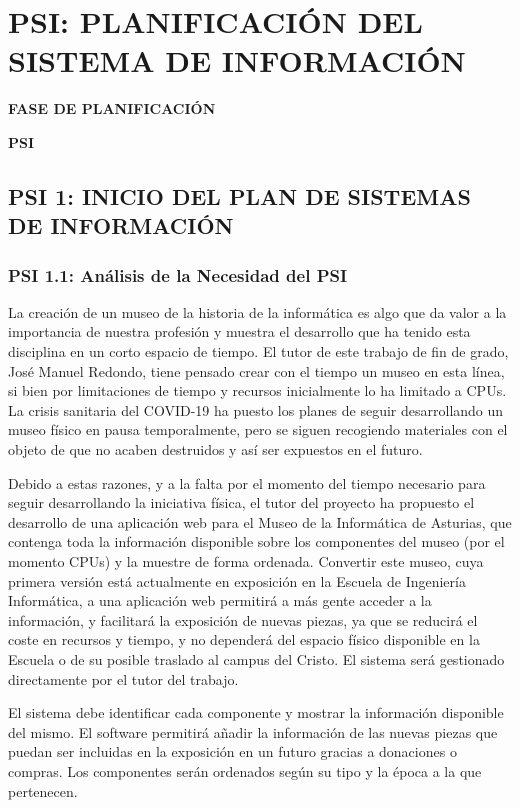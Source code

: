 \pagestyle{fancy}
\chapter{PSI: PLANIFICACIÓN DEL SISTEMA DE INFORMACIÓN}

	\vspace{2cm}	
	\begin{center}
	{\Large \textbf{FASE DE PLANIFICACIÓN} \par}
	\end{center}
	\vspace{5cm}
	
	\begin{center}
	\Huge \textbf{PSI}\par
	\end{center}

\newpage

\section{PSI 1: INICIO DEL PLAN DE SISTEMAS DE INFORMACIÓN}

\subsection{PSI 1.1: Análisis de la Necesidad del PSI} 
La creación de un museo de la historia de la informática es algo que da valor a la importancia de nuestra profesión y muestra el desarrollo que ha tenido esta disciplina en un corto espacio de tiempo. El tutor de este trabajo de fin de grado, José Manuel Redondo, tiene pensado crear con el tiempo un museo en esta línea, si bien por limitaciones de tiempo y recursos inicialmente lo ha limitado a CPUs. La crisis sanitaria del COVID-19 ha puesto los planes de seguir desarrollando un museo físico en pausa temporalmente, pero se siguen recogiendo materiales con el objeto de que no acaben destruidos y así ser expuestos en el futuro.\par
Debido a estas razones, y a la falta por el momento del tiempo necesario para seguir desarrollando la iniciativa física, el tutor del proyecto ha propuesto el desarrollo de una aplicación web para el Museo de la Informática de Asturias, que contenga toda la información disponible sobre los componentes del museo (por el momento CPUs) y la muestre de forma ordenada. Convertir este museo, cuya primera versión está actualmente en exposición en la Escuela de Ingeniería Informática, a una aplicación web permitirá a más gente acceder a la información, y facilitará la exposición de nuevas piezas, ya que se reducirá el coste en recursos y tiempo, y no dependerá del espacio físico disponible en la Escuela o de su posible traslado al campus del Cristo. El sistema será gestionado directamente por el tutor del trabajo.
\par El sistema debe identificar cada componente y mostrar la información disponible del mismo. El software permitirá añadir la información de las nuevas piezas que puedan ser incluidas en la exposición en un futuro gracias a donaciones o compras. Los componentes serán ordenados según su tipo y la época a la que pertenecen. 

